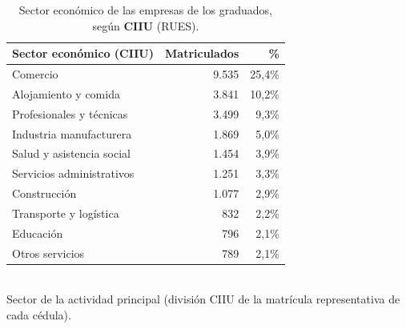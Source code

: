 \begin{table}[H]\centering\footnotesize
\caption{Sector económico de las empresas de los graduados, según \textbf{CIIU} (RUES).}\label{tab:rues_sector}
\begin{tabular}{lrr}
\toprule
\rowcolor{ustaazul}\textbf{\color{white}Sector económico (CIIU)} & \textbf{\color{white}Matriculados} & \textbf{\color{white}\%} \\
\midrule
Comercio & 9.535 & 25,4\% \\
Alojamiento y comida & 3.841 & 10,2\% \\
Profesionales y técnicas & 3.499 & 9,3\% \\
Industria manufacturera & 1.869 & 5,0\% \\
Salud y asistencia social & 1.454 & 3,9\% \\
Servicios administrativos & 1.251 & 3,3\% \\
Construcción & 1.077 & 2,9\% \\
Transporte y logística & 832 & 2,2\% \\
Educación & 796 & 2,1\% \\
Otros servicios & 789 & 2,1\% \\
\bottomrule
\end{tabular}
\\[2pt]{\scriptsize\color{ustagris} Sector de la actividad principal (división CIIU de la matrícula representativa de cada cédula).}
\end{table}